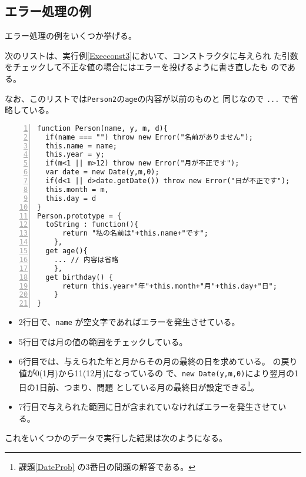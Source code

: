 \subsection{エラー処理の例}
エラー処理の例をいくつか挙げる。
 \begin{Exec}\upshape\label{throwError}
	次のリストは、実行例\ref{Execconst3}において、コンストラクタに与えられ
	た引数をチェックして不正な値の場合にはエラーを投げるように書き直したも
	のである。

	なお、このリストでは\texttt{Person2}の\texttt{age}の内容が以前のものと
	同じなので \texttt{...} で省略している。
 \end{Exec}
\begin{Verbatim}[numbers=left]
function Person(name, y, m, d){
  if(name === "") throw new Error("名前がありません");
  this.name = name;
  this.year = y;
  if(m<1 || m>12) throw new Error("月が不正です");
  var date = new Date(y,m,0);
  if(d<1 || d>date.getDate()) throw new Error("日が不正です");
  this.month = m,
  this.day = d
}
Person.prototype = {
  toString : function(){
      return "私の名前は"+this.name+"です";
    },
  get age(){
    ... // 内容は省略
    },
  get birthday() {
      return this.year+"年"+this.month+"月"+this.day+"日";
    }
}
\end{Verbatim}
\begin{itemize}
 \item 2行目で、\texttt{name} が空文字であればエラーを発生させている。
 \item 5行目では月の値の範囲をチェックしている。
 \item 6行目では、与えられた年と月からその月の最終の日を求めている。
			 の戻り値が0(1月)から11(12月)になっているの
			 で、\texttt{new Date(y,m,0)}により翌月の1日の1日前、つまり、問題
			 としている月の最終日が設定できる\footnote{課題\ref{DateProb}
			 の3番目の問題の解答である。}。
 \item 7行目で与えられた範囲に日が含まれていなければエラーを発生させてい
			 る。
\end{itemize}
これをいくつかのデータで実行した結果は次のようになる。
